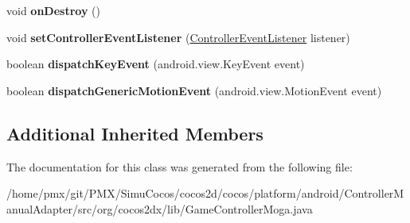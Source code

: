 \begin{DoxyCompactItemize}
void {\bfseries on\+Destroy} ()
\item 
\mbox{\label{classorg_1_1cocos2dx_1_1lib_1_1GameControllerMoga_a20732182f0558413e840dbadccf5811a}} 
void {\bfseries set\+Controller\+Event\+Listener} (\hyperlink{interfaceorg_1_1cocos2dx_1_1lib_1_1GameControllerDelegate_1_1ControllerEventListener}{Controller\+Event\+Listener} listener)
\item 
\mbox{\label{classorg_1_1cocos2dx_1_1lib_1_1GameControllerMoga_ab80255cc454b1a97b07e68d8b08678b9}} 
boolean {\bfseries dispatch\+Key\+Event} (android.\+view.\+Key\+Event event)
\item 
\mbox{\label{classorg_1_1cocos2dx_1_1lib_1_1GameControllerMoga_ad9c238267baec0f597b2f6370bed3045}} 
boolean {\bfseries dispatch\+Generic\+Motion\+Event} (android.\+view.\+Motion\+Event event)
\end{DoxyCompactItemize}
\subsection*{Additional Inherited Members}


The documentation for this class was generated from the following file\+:\begin{DoxyCompactItemize}
\item 
/home/pmx/git/\+P\+M\+X/\+Simu\+Cocos/cocos2d/cocos/platform/android/\+Controller\+Manual\+Adapter/src/org/cocos2dx/lib/Game\+Controller\+Moga.\+java\end{DoxyCompactItemize}
